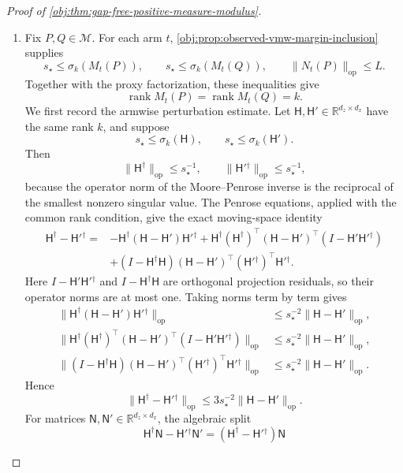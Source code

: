 \documentclass[11pt]{article}
\begin{document}
\begin{proof}[Proof of \cref{obj:thm:gap-free-positive-measure-modulus}]
\begin{enumerate}
\item Fix \(P,Q\in\mathcal M\).  For each arm \(t\), \cref{obj:prop:observed-vmw-margin-inclusion} supplies
\[
s_\star\le\sigma_k(M_t(P)),
\qquad
s_\star\le\sigma_k(M_t(Q)),
\qquad
\|N_t(P)\|_{\mathrm{op}}\le L .
\]
Together with the proxy factorization, these inequalities give
\[
\operatorname{rank}M_t(P)=\operatorname{rank}M_t(Q)=k .
\]
We first record the armwise perturbation estimate.  Let \(\mathsf H,\mathsf H'\in\mathbb R^{d_z\times d_x}\) have the same rank \(k\), and suppose
\[
s_\star\le \sigma_k(\mathsf H),
\qquad
s_\star\le \sigma_k(\mathsf H') .
\]
Then
\[
\|\mathsf H^\dagger\|_{\mathrm{op}}\le s_\star^{-1},
\qquad
\|\mathsf H'{}^\dagger\|_{\mathrm{op}}\le s_\star^{-1},
\]
because the operator norm of the Moore--Penrose inverse is the reciprocal of the smallest nonzero singular value.  The Penrose equations, applied with the common rank condition, give the exact moving-space identity
\[
\begin{aligned}
\mathsf H^\dagger-\mathsf H'{}^\dagger
={}&-\mathsf H^\dagger(\mathsf H-\mathsf H')\mathsf H'{}^\dagger
+\mathsf H^\dagger(\mathsf H^\dagger)^\top
  (\mathsf H-\mathsf H')^\top(I-\mathsf H'\mathsf H'{}^\dagger)\\
&+(I-\mathsf H^\dagger\mathsf H)(\mathsf H-\mathsf H')^\top
  (\mathsf H'{}^\dagger)^\top\mathsf H'{}^\dagger .
\end{aligned}
\]
Here \(I-\mathsf H'\mathsf H'{}^\dagger\) and \(I-\mathsf H^\dagger\mathsf H\) are orthogonal projection residuals, so their operator norms are at most one.  Taking norms term by term gives
\[
\begin{aligned}
\|\mathsf H^\dagger(\mathsf H-\mathsf H')\mathsf H'{}^\dagger\|_{\mathrm{op}}
&\le s_\star^{-2}\|\mathsf H-\mathsf H'\|_{\mathrm{op}},\\
\|\mathsf H^\dagger(\mathsf H^\dagger)^\top
  (\mathsf H-\mathsf H')^\top(I-\mathsf H'\mathsf H'{}^\dagger)\|_{\mathrm{op}}
&\le s_\star^{-2}\|\mathsf H-\mathsf H'\|_{\mathrm{op}},\\
\|(I-\mathsf H^\dagger\mathsf H)(\mathsf H-\mathsf H')^\top
  (\mathsf H'{}^\dagger)^\top\mathsf H'{}^\dagger\|_{\mathrm{op}}
&\le s_\star^{-2}\|\mathsf H-\mathsf H'\|_{\mathrm{op}}.
\end{aligned}
\]
Hence
\[
\|\mathsf H^\dagger-\mathsf H'{}^\dagger\|_{\mathrm{op}}
\le
3s_\star^{-2}\|\mathsf H-\mathsf H'\|_{\mathrm{op}} .
\]
For matrices \(\mathsf N,\mathsf N'\in\mathbb R^{d_z\times d_x}\), the algebraic split
\[
\mathsf H^\dagger\mathsf N-\mathsf H'{}^\dagger\mathsf N'
=
(\mathsf H^\dagger-\mathsf H'{}^\dagger)\mathsf N
\]
\end{enumerate}
\end{proof}
\end{document}
